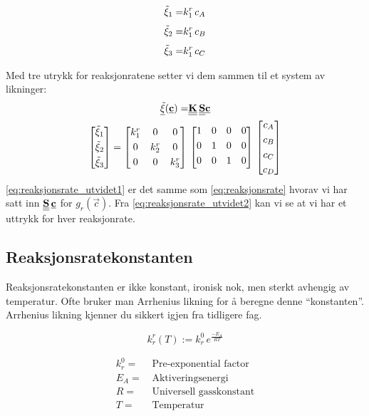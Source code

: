 \begin{align}
    \Tilde{\xi}_1 =& k^r_1\,c_A \\[0.3em]
    \Tilde{\xi}_2 =& k^r_1\,c_B \\[0.3em]
    \Tilde{\xi}_3 =& k^r_1\,c_C \\
\end{align}

Med tre utrykk for reaksjonratene setter vi dem sammen til et system av likninger:
\begin{align}
    \label{eq:reaksjonsrate_utvidet1}
    \underline{\Tilde{\xi}}(\underline{\textbf{c}}) =& \underline{\underline{\textbf{K}}}\,\underline{\underline{\textbf{S}}}\underline{\textbf{c}}
    \\
    \label{eq:reaksjonsrate_utvidet2}
    \begin{bmatrix}
    \Tilde{\xi}_1 \\[0.3em]
    \Tilde{\xi}_2 \\[0.3em]
    \Tilde{\xi}_3
    \end{bmatrix}   
    =
    \begin{bmatrix}
    k^r_1 & 0 & 0 \\[0.3em]
    0 & k^r_2 & 0\\[0.3em]
    0 & 0 & k^r_3
    \end{bmatrix}
    \,&
   \begin{bmatrix}
   1 & 0 & 0 & 0\\[0.3em]
   0 & 1 & 0 & 0\\[0.3em]
   0 & 0 & 1 & 0\\[0.3em]
   \end{bmatrix}
   \,
   \begin{bmatrix}
   c_A\\[0.3em]
   c_B\\[0.3em]
   c_C\\[0.3em]
   c_D
   \end{bmatrix}
\end{align}
\cref{eq:reaksjonsrate_utvidet1} er det samme som \cref{eq:reaksjonsrate} hvorav vi har satt inn $\underline{\underline{\textbf{S}}}\,\underline{\textbf{c}}$ for $g_r(\vec{c})$. Fra \cref{eq:reaksjonsrate_utvidet2} kan vi se at vi har et uttrykk for hver reaksjonrate. 



\subsection{Reaksjonsratekonstanten}
Reaksjonsratekonstanten er ikke konstant, ironisk nok, men sterkt avhengig av temperatur. Ofte bruker man Arrhenius likning for å beregne denne ``konstanten''. Arrhenius likning kjenner du sikkert igjen fra tidligere fag.

\begin{equation}
    \label{eq:arrhenius}
    k^r_r(T) :=k^0_r\,e^{\frac{-E_{A}}{RT}}
\end{equation}

\begin{align*}
    k^0_r =&\, \text{Pre-exponential factor} \\
    E_A =&\, \text{Aktiveringsenergi} \\
    R =&\, \text{Universell gasskonstant} \\
    T =&\, \text{Temperatur}
\end{align*}


